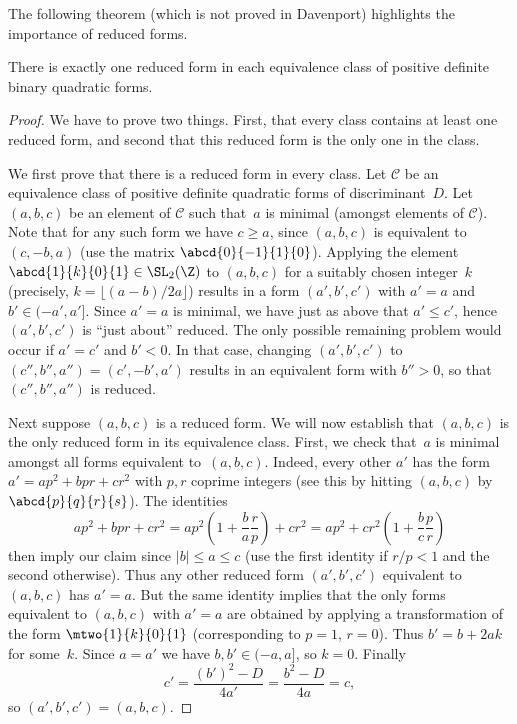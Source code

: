 \documentclass[11pt]{report}
\begin{document}
The following theorem (which is not proved in Davenport) highlights the
importance of reduced forms.
\begin{theorem}
  There is exactly one reduced form in each equivalence class of
  positive definite binary quadratic forms.
\end{theorem}
\begin{proof}
  We have to prove two things.  First, that every class contains at least
  one reduced form, and second that this reduced form is the only
  one in the class.

  We first prove that there is a reduced form in every class.
  Let $\mathcal{C}$ be an equivalence class of positive definite
  quadratic forms of discriminant~$D$.  Let~$(a,b,c)$ be
  an element of $\mathcal{C}$ such that~$a$ is minimal (amongst elements
  of $\mathcal{C}$).  Note that for any such form we
  have $c\geq a$, since $(a,b,c)$ is equivalent to
  $(c,-b,a)$ (use the matrix $\abcd{0}{-1}{1}{\hfill 0}$).
  Applying the element $\abcd{1}{k}{0}{1}\in\SL_2(\Z)$ to $(a,b,c)$
  for a suitably chosen integer~$k$ (precisely,
  $k=\lfloor(a-b)/2a\rfloor$) results in a form
  $(a',b',c')$ with $a'=a$ and $b'\in (-a',a']$.
  Since $a'=a$ is minimal, we have just as above that
  $a'\leq c'$, hence
  $(a',b',c')$ is ``just about'' reduced.
  The only possible remaining problem would occur if $a'=c'$
  and $b'<0$. In that case, changing $(a',b',c')$ to
  $(c'',b'',a'')=(c',-b',a')$
  results in an equivalent form with $b''>0$, so that
  $(c'',b'',a'')$ is reduced.

  Next suppose $(a,b,c)$ is a reduced form.  We
  will now establish that $(a,b,c)$ is the only reduced form
  in its equivalence class.  First, we check that~$a$ is minimal amongst all
  forms equivalent to~$(a,b,c)$.  Indeed, every other $a'$ has the
  form $a'=ap^2 + bpr + cr^2$ with $p,r$ coprime integers (see this
  by hitting $(a,b,c)$ by $\abcd{p}{q}{r}{s}$).  The
  identities
  $$
    a p^2 + bpr + c r^2 = a p^2 \left(1+\frac{b}{a}\frac{r}{p}\right)
    + cr^2 = a p^2 + c r^2\left( 1 + \frac{b}{c}\frac{p}{r}\right)
  $$
  then imply our claim since $|b|\leq a \leq c$
  (use the first identity if $r/p<1$ and the second otherwise).
  Thus any other reduced form $(a',b',c')$ equivalent to $(a,b,c)$
  has $a'=a$.  But the same identity implies that
  the only forms equivalent to $(a,b,c)$ with $a'=a$ are obtained by applying
  a transformation of the form $\mtwo{1}{k}{0}{1}$ (corresponding
  to $p=1$, $r=0$).  Thus $b' = b+2ak$ for some~$k$.
  Since $a=a'$ we have $b,b'\in(-a,a]$, so $k=0$.
  Finally
  $$
    c'=\frac{(b')^2-D}{4a'}=\frac{b^2-D}{4a} = c,
  $$
  so $(a',b',c')=(a,b,c)$.
\end{proof}
\end{document}
